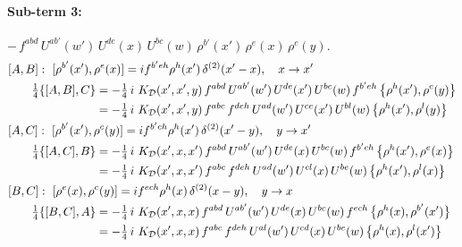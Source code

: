 \documentclass[10pt]{article}
\numberwithin{equation}{section}
\begin{document}
\paragraph{Sub-term 3:} $-\,f^{abd}\,U^{ab'}(w')\,U^{de}(x)\,U^{bc}(w)\,\rho^{b'}(x')\,\rho^{e}(x)\,\rho^{c}(y)$.
\begin{align}
&[A,B]:\ [\rho^{b'}(x'),\rho^{e}(x)]=i f^{b'eh}\rho^{h}(x')\,\delta^{(2)}(x'-x),\quad x\to x'\notag\\
&\qquad \tfrac14\{[A,B],C\}=-\tfrac14\,i\,\,K_{\mathcal D}(x',x',y)\,f^{abd}\,U^{ab'}(w')\,U^{de}(x')\,U^{bc}(w)\,f^{b'eh}\,\big\{\rho^{h}(x'),\rho^{c}(y)\big\}\notag\\
&\qquad\phantom{\tfrac14\{[A,B],C\}}=-\tfrac14\,i\,\,K_{\mathcal D}(x',x',y)\,f^{abc}\,f^{deh}\,U^{ad}(w')\,U^{ce}(x')\,U^{bl}(w)\,\big\{\rho^{h}(x'),\rho^{l}(y)\big\}
\label{T:eq:D-3-AB}\\
&[A,C]:\ [\rho^{b'}(x'),\rho^{c}(y)]=i f^{b'ch}\rho^{h}(x')\,\delta^{(2)}(x'-y),\quad y\to x'\notag\\
&\qquad \tfrac14\{[A,C],B\}=-\tfrac14\,i\,\,K_{\mathcal D}(x',x,x')\,f^{abd}\,U^{ab'}(w')\,U^{de}(x)\,U^{bc}(w)\,f^{b'ch}\,\big\{\rho^{h}(x'),\rho^{e}(x)\big\}\notag\\
&\qquad\phantom{\tfrac14\{[A,C],B\}}=-\tfrac14\,i\,\,K_{\mathcal D}(x',x,x')\,f^{abc}\,f^{deh}\,U^{ad}(w')\,U^{cl}(x)\,U^{be}(w)\,\big\{\rho^{h}(x'),\rho^{l}(x)\big\}
\label{T:eq:D-3-AC}\\
&[B,C]:\ [\rho^{e}(x),\rho^{c}(y)]=i f^{ech}\rho^{h}(x)\,\delta^{(2)}(x-y),\quad y\to x\notag\\
&\qquad \tfrac14\{[B,C],A\}=-\tfrac14\,i\,\,K_{\mathcal D}(x',x,x)\,f^{abd}\,U^{ab'}(w')\,U^{de}(x)\,U^{bc}(w)\,f^{ech}\,\big\{\rho^{h}(x),\rho^{b'}(x')\big\}\notag\\
&\qquad\phantom{\tfrac14\{[B,C],A\}}=-\tfrac14\,i\,\,K_{\mathcal D}(x',x,x)\,f^{abc}\,f^{deh}\,U^{al}(w')\,U^{cd}(x)\,U^{be}(w)\,\big\{\rho^{h}(x),\rho^{l}(x')\big\}
\label{T:eq:D-3-BC}
\end{align}
\end{document}
